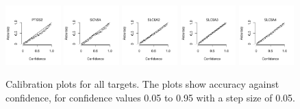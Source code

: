 \documentclass[10pt,article]{memoir}
\begin{document}
\begin{figure}[h!]
    \includegraphics[width=0.19\textwidth]{figures/calibration_plots/ptgs2_calib.pdf}
    \includegraphics[width=0.19\textwidth]{figures/calibration_plots/scn5a_calib.pdf}
    \includegraphics[width=0.19\textwidth]{figures/calibration_plots/slc6a2_calib.pdf}
    \includegraphics[width=0.19\textwidth]{figures/calibration_plots/slc6a3_calib.pdf}
    \vspace*{-15pt} %
    \includegraphics[width=0.19\textwidth]{figures/calibration_plots/slc6a4_calib.pdf}
        \caption{Calibration plots for all targets. The plots show accuracy against
            confidence, for confidence values 0.05 to 0.95 with a step size of 0.05.
        \label{fig:calplots_all}}
\end{figure}

\clearpage
\end{document}
